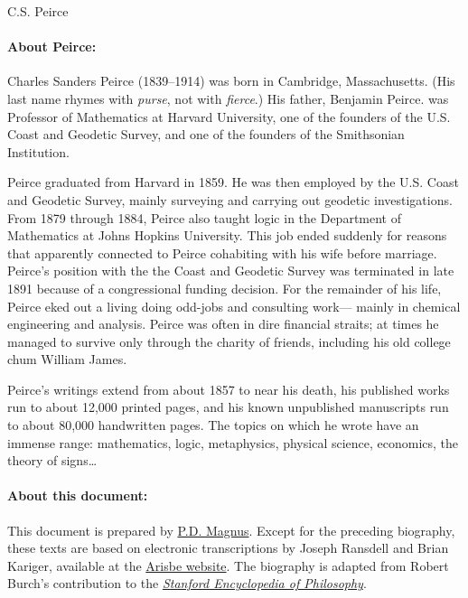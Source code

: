 \documentclass[]{article}
\newcommand{\authortitle}[1]{\centerline{\Huge\sc #1}}
\begin{document}
\twocolumn
\authortitle{C.S. Peirce}

\bigskip


\paragraph{About Peirce:}
Charles Sanders Peirce (1839--1914) was born in Cambridge,
Massachusetts. (His last name rhymes with \emph{purse}, not with \emph{fierce}.) His father, Benjamin Peirce. was Professor of Mathematics at
Harvard University, one of the founders of the U.S. Coast and
Geodetic Survey, and one of the founders of the Smithsonian
Institution.

Peirce graduated from Harvard in 1859. He was then
employed by the U.S. Coast and Geodetic Survey, mainly surveying and
carrying out geodetic investigations. From 1879 through 1884, Peirce
also taught logic in the Department of Mathematics at Johns Hopkins University. This job ended suddenly for reasons that
apparently connected to Peirce cohabiting with his wife before marriage. Peirce's position with the the Coast and Geodetic Survey was
terminated in late 1891 because of a congressional funding decision. For the remainder of his life, Peirce eked out a living doing odd-jobs and consulting work--- mainly in chemical engineering and analysis. Peirce was often in dire financial straits; at times he managed to survive only through the charity of friends, including his old college chum William James.

Peirce's writings extend from about 1857 to near his
death, his published works run to about 12,000 printed pages, and his known unpublished manuscripts run to about 80,000 handwritten pages. The topics on which he wrote have an immense range: mathematics, logic, metaphysics, physical science, economics, the theory of signs\ldots

\paragraph{About this document:}
This document is prepared by \href{https://www.fecundity.com}{P.D. Magnus}. Except for the preceding biography, these texts are based on electronic transcriptions by Joseph Ransdell and Brian Kariger, available at the \href{http://members.door.net/arisbe}{Arisbe website}. The biography is adapted from Robert Burch's contribution to the \href{http://plato.stanford.edu}{\emph{Stanford Encyclopedia of Philosophy}}.
\end{document}
